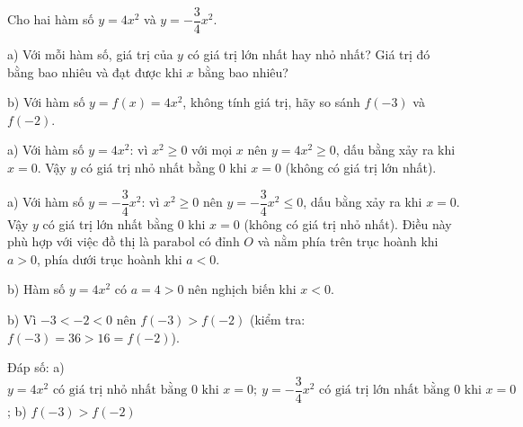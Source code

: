 \begin{problem}[9DS-HSB2-033]
Cho hai hàm số $y = 4x^2$ và $y = -\dfrac{3}{4}x^2$.

a) Với mỗi hàm số, giá trị của $y$ có giá trị lớn nhất hay nhỏ nhất? Giá trị đó bằng bao nhiêu và đạt được khi $x$ bằng bao nhiêu?

b) Với hàm số $y = f(x) = 4x^2$, không tính giá trị, hãy so sánh $f(-3)$ và $f(-2)$.

\begin{solution}
a) Với hàm số $y = 4x^2$: vì $x^2 \geq 0$ với mọi $x$ nên $y = 4x^2 \geq 0$, dấu bằng xảy ra khi $x = 0$. Vậy $y$ có giá trị nhỏ nhất bằng $0$ khi $x = 0$ (không có giá trị lớn nhất).

a) Với hàm số $y = -\dfrac{3}{4}x^2$: vì $x^2 \geq 0$ nên $y = -\dfrac{3}{4}x^2 \leq 0$, dấu bằng xảy ra khi $x = 0$. Vậy $y$ có giá trị lớn nhất bằng $0$ khi $x = 0$ (không có giá trị nhỏ nhất). Điều này phù hợp với việc đồ thị là parabol có đỉnh $O$ và nằm phía trên trục hoành khi $a > 0$, phía dưới trục hoành khi $a < 0$.

b) Hàm số $y = 4x^2$ có $a = 4 > 0$ nên nghịch biến khi $x < 0$.

b) Vì $-3 < -2 < 0$ nên $f(-3) > f(-2)$ (kiểm tra: $f(-3) = 36 > 16 = f(-2)$).

Đáp số: a) $\boxed{y = 4x^2 \text{ có giá trị nhỏ nhất bằng } 0 \text{ khi } x = 0;\ y = -\dfrac{3}{4}x^2 \text{ có giá trị lớn nhất bằng } 0 \text{ khi } x = 0}$; b) $\boxed{f(-3) > f(-2)}$
\end{solution}
\end{problem}


